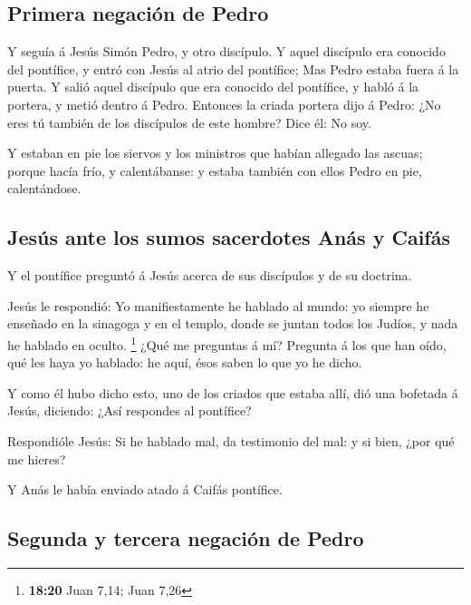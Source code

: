 \hypertarget{primera-negaciuxf3n-de-pedro}{%
\subsection{Primera negación de
Pedro}\label{primera-negaciuxf3n-de-pedro}}

 Y seguía á Jesús Simón Pedro, y otro discípulo. Y aquel
discípulo era conocido del pontífice, y entró con Jesús al atrio del
pontífice;  Mas Pedro estaba fuera á la puerta. Y salió
aquel discípulo que era conocido del pontífice, y habló á la portera, y
metió dentro á Pedro.  Entonces la criada portera dijo á
Pedro: ¿No eres tú también de los discípulos de este hombre? Dice él: No
soy.

 Y estaban en pie los siervos y los ministros que habían
allegado las ascuas; porque hacía frío, y calentábanse: y estaba también
con ellos Pedro en pie, calentándose.

\hypertarget{jesuxfas-ante-los-sumos-sacerdotes-anuxe1s-y-caifuxe1s}{%
\subsection{Jesús ante los sumos sacerdotes Anás y
Caifás}\label{jesuxfas-ante-los-sumos-sacerdotes-anuxe1s-y-caifuxe1s}}

 Y el pontífice preguntó á Jesús acerca de sus discípulos y
de su doctrina.

 Jesús le respondió: Yo manifiestamente he hablado al
mundo: yo siempre he enseñado en la sinagoga y en el templo, donde se
juntan todos los Judíos, y nada he hablado en oculto. \footnote{\textbf{18:20}
  Juan 7,14; Juan 7,26}  ¿Qué me preguntas á mí? Pregunta á
los que han oído, qué les haya yo hablado: he aquí, ésos saben lo que yo
he dicho.

 Y como él hubo dicho esto, uno de los criados que estaba
allí, dió una bofetada á Jesús, diciendo: ¿Así respondes al pontífice?

 Respondióle Jesús: Si he hablado mal, da testimonio del
mal: y si bien, ¿por qué me hieres?

 Y Anás le había enviado atado á Caifás pontífice.

\hypertarget{segunda-y-tercera-negaciuxf3n-de-pedro}{%
\subsection{Segunda y tercera negación de
Pedro}\label{segunda-y-tercera-negaciuxf3n-de-pedro}}

